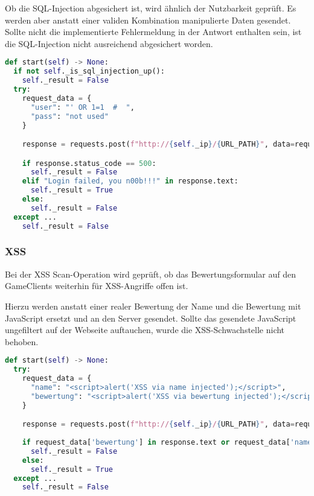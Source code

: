 Ob die SQL-Injection abgesichert ist, wird ähnlich der Nutzbarkeit geprüft. Es werden aber anstatt einer validen Kombination manipulierte Daten gesendet. Sollte nicht die implementierte Fehlermeldung  in der Antwort enthalten sein, ist die SQL-Injection nicht ausreichend abgesichert worden.

\begin{lstlisting}[language=Python, frame=single, caption={Big Brother SQL-Injection Save}, captionpos=b, label={lst:bigbrother-sql-injection-save}]
def start(self) -> None:
  if not self._is_sql_injection_up():
    self._result = False
  try:
    request_data = {
      "user": "' OR 1=1  #  ",
      "pass": "not used"
    }

    response = requests.post(f"http://{self._ip}/{URL_PATH}", data=request_data)

    if response.status_code == 500:
      self._result = False
    elif "Login failed, you n00b!!!" in response.text:
      self._result = True
    else:
      self._result = False
  except ...
    self._result = False
\end{lstlisting}

\subsubsection{XSS}
Bei der XSS Scan-Operation wird geprüft, ob das Bewertungsformular auf den GameClients weiterhin für XSS-Angriffe offen ist.

Hierzu werden anstatt einer realer Bewertung der Name und die Bewertung mit JavaScript ersetzt und an den Server gesendet. Sollte das gesendete JavaScript ungefiltert auf der Webseite auftauchen, wurde die XSS-Schwachstelle nicht behoben.
\begin{lstlisting}[language=Python, frame=single, caption={Big Brother XSS Save}, captionpos=b, label={lst:bigbrother-xss-save}]
def start(self) -> None:
  try:
    request_data = {
      "name": "<script>alert('XSS via name injected');</script>",
      "bewertung": "<script>alert('XSS via bewertung injected');</script>"
    }

    response = requests.post(f"http://{self._ip}/{URL_PATH}", data=request_data)
    
    if request_data['bewertung'] in response.text or request_data['name'] in response.text:
      self._result = False
    else:
      self._result = True
  except ...
    self._result = False
\end{lstlisting}

